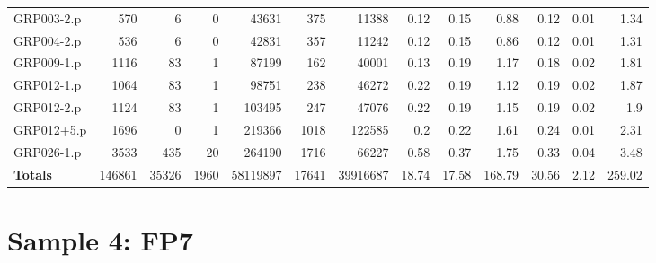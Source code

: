 \begin{table}[H]
\begin{adjustwidth}{-0.4in}{-0.5in}
\begin{tabular}{| l || r | r | r || r | r | r || r | r | r | r | r | r |}
GRP003-2.p&570&6&0&43631&375&11388&0.12&0.15&0.88&0.12&0.01&1.34\\
GRP004-2.p&536&6&0&42831&357&11242&0.12&0.15&0.86&0.12&0.01&1.31\\
GRP009-1.p&1116&83&1&87199&162&40001&0.13&0.19&1.17&0.18&0.02&1.81\\
GRP012-1.p&1064&83&1&98751&238&46272&0.22&0.19&1.12&0.19&0.02&1.87\\
GRP012-2.p&1124&83&1&103495&247&47076&0.22&0.19&1.15&0.19&0.02&1.9\\
GRP012+5.p&1696&0&1&219366&1018&122585&0.2&0.22&1.61&0.24&0.01&2.31\\
GRP026-1.p&3533&435&20&264190&1716&66227&0.58&0.37&1.75&0.33&0.04&3.48\\ \hline \hline
\textbf{Totals}&146861&35326&1960&58119897&17641&39916687&18.74&17.58&168.79&30.56&2.12&259.02\\\hline
\end{tabular}\end{adjustwidth}\end{table}

\section{Sample 4: FP7}


